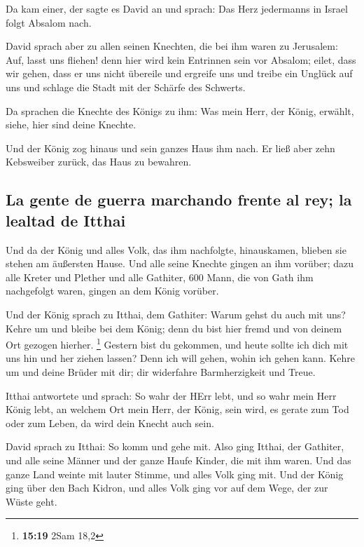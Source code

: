 Da kam einer, der sagte es David an und sprach: Das Herz
jedermanns in Israel folgt Absalom nach.

 David sprach aber zu allen seinen Knechten, die bei ihm
waren zu Jerusalem: Auf, lasst uns fliehen! denn hier wird kein
Entrinnen sein vor Absalom; eilet, dass wir gehen, dass er uns nicht
übereile und ergreife uns und treibe ein Unglück auf uns und schlage die
Stadt mit der Schärfe des Schwerts.

 Da sprachen die Knechte des Königs zu ihm: Was mein
Herr, der König, erwählt, siehe, hier sind deine Knechte.

 Und der König zog hinaus und sein ganzes Haus ihm nach.
Er ließ aber zehn Kebsweiber zurück, das Haus zu bewahren.

\hypertarget{la-gente-de-guerra-marchando-frente-al-rey-la-lealtad-de-itthai}{%
\subsection{La gente de guerra marchando frente al rey; la lealtad de
Itthai}\label{la-gente-de-guerra-marchando-frente-al-rey-la-lealtad-de-itthai}}

 Und da der König und alles Volk, das ihm nachfolgte,
hinauskamen, blieben sie stehen am äußersten Hause.  Und
alle seine Knechte gingen an ihm vorüber; dazu alle Kreter und Plether
und alle Gathiter, 600 Mann, die von Gath ihm nachgefolgt waren, gingen
an dem König vorüber.

 Und der König sprach zu Itthai, dem Gathiter: Warum
gehst du auch mit uns? Kehre um und bleibe bei dem König; denn du bist
hier fremd und von deinem Ort gezogen hierher. \footnote{\textbf{15:19}
  2Sam 18,2}  Gestern bist du gekommen, und heute sollte
ich dich mit uns hin und her ziehen lassen? Denn ich will gehen, wohin
ich gehen kann. Kehre um und deine Brüder mit dir; dir widerfahre
Barmherzigkeit und Treue.

 Itthai antwortete und sprach: So wahr der HErr lebt, und
so wahr mein Herr König lebt, an welchem Ort mein Herr, der König, sein
wird, es gerate zum Tod oder zum Leben, da wird dein Knecht auch sein.

 David sprach zu Itthai: So komm und gehe mit. Also ging
Itthai, der Gathiter, und alle seine Männer und der ganze Haufe Kinder,
die mit ihm waren.  Und das ganze Land weinte mit lauter
Stimme, und alles Volk ging mit. Und der König ging über den Bach
Kidron, und alles Volk ging vor auf dem Wege, der zur Wüste geht.

